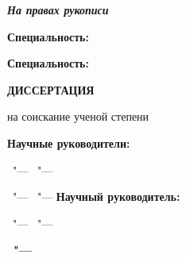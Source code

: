 \thispagestyle{empty}
\begin{center}
\textbf{\thesisOrganization}
\end{center}
%
\vspace{0pt plus3fill} %
\begin{flushright}
\textbf{\textit{На правах рукописи}}
\end{flushright}
%
\vspace{0pt plus4fill} %
\begin{center}
\textbf{\large \thesisAuthor}
\end{center}
%
\vspace{0pt plus2fill} %
\begin{center}
\textbf{\large \thesisTitle}

\vspace{0pt plus2fill} %
\textbf{Специальность: \thesisSpecialtyNumber\ \thesisSpecialtyTitle}

\ifdefined\thesisSpecialtyTwoNumber
\textbf{Специальность: \thesisSpecialtyTwoNumber\ \thesisSpecialtyTwoTitle}
\fi

\vspace{0pt plus2fill} %
{\bfseries ДИССЕРТАЦИЯ

на соискание ученой степени

\thesisDegree}
\end{center}
%
\vspace{0pt plus4fill} %
\begin{flushright}
\begin{minipage}{0.5\linewidth}
\raggedright{}\relax
\ifdefined\supervisorTwoFio
\textbf{Научные руководители:}

\ifdefined\supervisorDead
\framebox{\supervisorFio}\ "--- \supervisorRegalia
\else
\supervisorFio\ "--- \supervisorRegalia
\fi

\ifdefined\supervisorTwoDead
\framebox{\supervisorTwoFio}\ "--- \supervisorTwoRegalia
\else
\supervisorTwoFio\ "--- \supervisorTwoRegalia
\fi
\else
\textbf{Научный руководитель:}

\ifdefined\supervisorDead
\framebox{\supervisorFio}\ "--- \supervisorRegalia
\else
\supervisorFio\ "--- \supervisorRegalia
\fi
\fi
\end{minipage}
\end{flushright}
%
\vspace{0pt plus3fill} %
{\centering\bfseries\thesisCity\ "--- \thesisYear\par}
